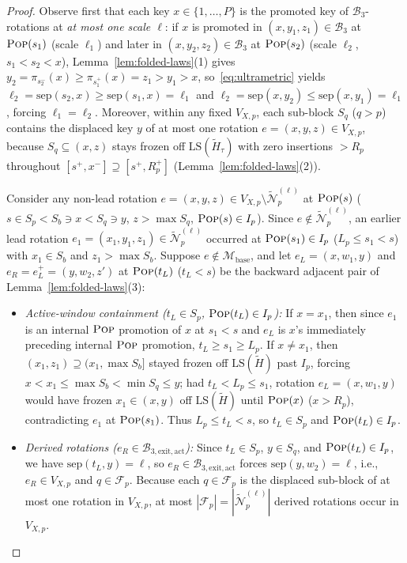 \documentclass[11pt]{article}
\theoremstyle{definition}
\theoremstyle{remark}
\newcommand{\LS}{\mathrm{LS}}
\newcommand{\sep}{\mathrm{sep}}
\newcommand{\POP}{\textnormal{\scshape Pop}}
\begin{document}
\begin{proof}
Observe first that each key $x \in \{1, \dots, P\}$ is the promoted key of $\mathcal{B}_3$-rotations at \emph{at most one scale $\ell$}: if $x$ is promoted in $(x, y_1, z_1) \in \mathcal{B}_3$ at $\POP(s_1)$ (scale $\ell_1$) and later in $(x, y_2, z_2) \in \mathcal{B}_3$ at $\POP(s_2)$ (scale $\ell_2$, $s_1 < s_2 < x$), Lemma~\ref{lem:folded-laws}(1) gives $y_2 = \pi_{s_2^-}(x) \ge \pi_{s_1^+}(x) = z_1 > y_1 > x$, so~\eqref{eq:ultrametric} yields $\ell_2 = \sep(s_2, x) \ge \sep(s_1, x) = \ell_1$ and $\ell_2 = \sep(x, y_2) \le \sep(x, y_1) = \ell_1$, forcing $\ell_1 = \ell_2$. Moreover, within any fixed $V_{X, p}$, each sub-block $S_q$ ($q > p$) contains the displaced key $y$ of at most one rotation $e = (x, y, z) \in V_{X, p}$, because $S_q \subseteq (x, z)$ stays frozen off $\LS(\widetilde{H}_\tau)$ with zero insertions $> R_p$ throughout $[s^+, x^-] \supseteq [s^+, R_p^+]$ (Lemma~\ref{lem:folded-laws}(2)).

Consider any non-lead rotation $e = (x, y, z) \in V_{X, p} \setminus \widetilde{\mathcal{N}}_p^{(\ell)}$ at $\POP(s)$ ($s \in S_p < S_b \ni x < S_q \ni y$, $z > \max S_q$, $\POP(s) \in I_p$). Since $e \notin \widetilde{\mathcal{N}}_p^{(\ell)}$, an earlier lead rotation $e_1 = (x_1, y_1, z_1) \in \widetilde{\mathcal{N}}_p^{(\ell)}$ occurred at $\POP(s_1) \in I_p$ ($L_p \le s_1 < s$) with $x_1 \in S_b$ and $z_1 > \max S_b$. Suppose $e \notin \mathcal{M}_{\mathrm{base}}$, and let $e_L = (x, w_1, y)$ and $e_R = e_L^+ = (y, w_2, z')$ at $\POP(t_L)$ ($t_L < s$) be the backward adjacent pair of Lemma~\ref{lem:folded-laws}(3):
\begin{itemize}[leftmargin=2em]
  \item \emph{Active-window containment ($t_L \in S_p$, $\POP(t_L) \in I_p$):} If $x = x_1$, then since $e_1$ is an internal $\POP$ promotion of $x$ at $s_1 < s$ and $e_L$ is $x$'s immediately preceding internal $\POP$ promotion, $t_L \ge s_1 \ge L_p$. If $x \ne x_1$, then $(x_1, z_1) \supseteq (x_1, \max S_b]$ stayed frozen off $\LS(\widetilde{H})$ past $I_p$, forcing $x < x_1 \le \max S_b < \min S_q \le y$; had $t_L < L_p \le s_1$, rotation $e_L = (x, w_1, y)$ would have frozen $x_1 \in (x, y)$ off $\LS(\widetilde{H})$ until $\POP(x)$ ($x > R_p$), contradicting $e_1$ at $\POP(s_1)$. Thus $L_p \le t_L < s$, so $t_L \in S_p$ and $\POP(t_L) \in I_p$.
  \item \emph{Derived rotations ($e_R \in \mathcal{B}_{3,\mathrm{exit,act}}$):} Since $t_L \in S_p$, $y \in S_q$, and $\POP(t_L) \in I_p$, we have $\sep(t_L, y) = \ell$, so $e_R \in \mathcal{B}_{3,\mathrm{exit,act}}$ forces $\sep(y, w_2) = \ell$, i.e., $e_R \in V_{X, p}$ and $q \in \mathcal{F}_p$. Because each $q \in \mathcal{F}_p$ is the displaced sub-block of at most one rotation in $V_{X, p}$, at most $|\mathcal{F}_p| = |\widetilde{\mathcal{N}}_p^{(\ell)}|$ derived rotations occur in $V_{X, p}$.
\end{itemize}


\end{proof}
\end{document}
